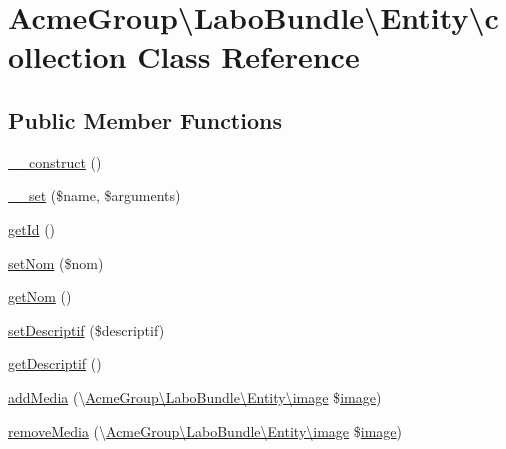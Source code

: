 \hypertarget{class_acme_group_1_1_labo_bundle_1_1_entity_1_1collection}{\section{Acme\+Group\textbackslash{}Labo\+Bundle\textbackslash{}Entity\textbackslash{}collection Class Reference}
\label{class_acme_group_1_1_labo_bundle_1_1_entity_1_1collection}
}
\subsection*{Public Member Functions}
\begin{DoxyCompactItemize}
\item 
\hyperlink{class_acme_group_1_1_labo_bundle_1_1_entity_1_1collection_aa9af6e6d937c93f9203686df8601c904}{\+\_\+\+\_\+construct} ()
\item 
\hyperlink{class_acme_group_1_1_labo_bundle_1_1_entity_1_1collection_af7a8ac1ec1fcb93e69f6012664b09db1}{\+\_\+\+\_\+set} (\$name, \$arguments)
\item 
\hyperlink{class_acme_group_1_1_labo_bundle_1_1_entity_1_1collection_a6fc762c898a1b46d5d09b6540c5bc502}{get\+Id} ()
\item 
\hyperlink{class_acme_group_1_1_labo_bundle_1_1_entity_1_1collection_ae14ffdd0b995ea902fd392335d58d8c9}{set\+Nom} (\$nom)
\item 
\hyperlink{class_acme_group_1_1_labo_bundle_1_1_entity_1_1collection_a6846dc4c809c309a950c583f7651f01d}{get\+Nom} ()
\item 
\hyperlink{class_acme_group_1_1_labo_bundle_1_1_entity_1_1collection_a6415ce9b9def5c08a6d573e6d52a4c6b}{set\+Descriptif} (\$descriptif)
\item 
\hyperlink{class_acme_group_1_1_labo_bundle_1_1_entity_1_1collection_ab9249820924904afbaafc992cd161b07}{get\+Descriptif} ()
\item 
\hyperlink{class_acme_group_1_1_labo_bundle_1_1_entity_1_1collection_a242dc5bd81a8ece1c3deb875b4eae7cc}{add\+Media} (\textbackslash{}\hyperlink{class_acme_group_1_1_labo_bundle_1_1_entity_1_1image}{Acme\+Group\textbackslash{}\+Labo\+Bundle\textbackslash{}\+Entity\textbackslash{}image} \$\hyperlink{class_acme_group_1_1_labo_bundle_1_1_entity_1_1image}{image})
\item 
\hyperlink{class_acme_group_1_1_labo_bundle_1_1_entity_1_1collection_a5d2962ac80657df4cb098c4deb497776}{remove\+Media} (\textbackslash{}\hyperlink{class_acme_group_1_1_labo_bundle_1_1_entity_1_1image}{Acme\+Group\textbackslash{}\+Labo\+Bundle\textbackslash{}\+Entity\textbackslash{}image} \$\hyperlink{class_acme_group_1_1_labo_bundle_1_1_entity_1_1image}{image})

\end{DoxyCompactItemize}
